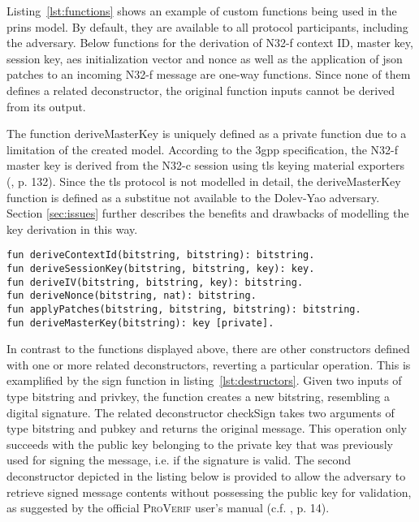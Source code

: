 Listing~\ref{lst:functions} shows an example of custom functions being used in the \gls{prins} model.
By default, they are available to all protocol participants, including the adversary.
Below functions for the derivation of N32-f context ID, master key, session key, \gls{aes} initialization vector and nonce as well as the application of json patches to an incoming N32-f message are one-way functions.
Since none of them defines a related deconstructor, the original function inputs cannot be derived from its output.

The function {\sffamily deriveMasterKey} is uniquely defined as a private function due to a limitation of the created model.
According to the \gls{3gpp} specification, the N32-f master key is derived from the N32-c session using \gls{tls} keying material exporters (\cite{3gpp.33.501}, p. 132).
Since the \gls{tls} protocol is not modelled in detail, the {\sffamily deriveMasterKey} function is defined as a substitue not available to the Dolev-Yao adversary.
Section \ref{sec:issues} further describes the benefits and drawbacks of modelling the key derivation in this way.

\begin{lstlisting}[caption={Definition of custom one-way functions},label={lst:functions},firstnumber=125]
fun deriveContextId(bitstring, bitstring): bitstring.
fun deriveSessionKey(bitstring, bitstring, key): key.
fun deriveIV(bitstring, bitstring, key): bitstring.
fun deriveNonce(bitstring, nat): bitstring.
fun applyPatches(bitstring, bitstring, bitstring): bitstring.
fun deriveMasterKey(bitstring): key [private].
\end{lstlisting}

In contrast to the functions displayed above, there are other constructors defined with one or more related deconstructors, reverting a particular operation.
This is examplified by the {\sffamily sign} function in listing~\ref{lst:destructors}.
Given two inputs of type {\sffamily bitstring} and {\sffamily privkey}, the function creates a new {\sffamily bitstring}, resembling a digital signature.
The related deconstructor {\sffamily checkSign} takes two arguments of type {\sffamily bitstring} and {\sffamily pubkey} and returns the original message.
This operation only succeeds with the public key belonging to the private key that was previously used for signing the message, i.e. if the signature is valid.
The second deconstructor depicted in the listing below is provided to allow the adversary to retrieve signed message contents without possessing the public key for validation, as suggested by the official \textsc{ProVerif} user's manual (c.f. \cite{blanchet2020proverif}, p. 14).

